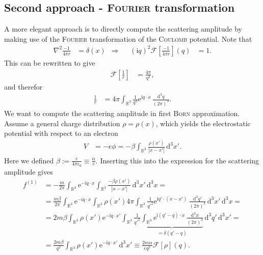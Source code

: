\documentclass[english, parskip=full]{scrartcl}
\newcommand{\intr}{}
\newcommand{\klam}{}
\def\I{\text{i}}
\def\e{\text{e}}
\begin{document}
\subsection{Second approach - \textsc{Fourier} transformation}
A more elegant approach is to directly compute the scattering amplitude by making use of the \textsc{Fourier} transformation of the \textsc{Coulomb} potential.
Note that
\begin{align}
\nabla^2\frac{-1}{4\pi r}&=\delta (x)&\Rightarrow && (\I q)^2\mathcal{F}\klam\left[ {\frac{-1}{4\pi r}} \right](q)&=1.
\end{align}
This can be rewritten to give
\begin{align}
\mathcal{F}\klam\left[ {\frac{1}{r}} \right]&=\frac{4\pi}{q^2},
\end{align}
and therefor
\begin{align}
\frac{1}{r}&=4\pi\intr\int_{\mathbb{R}^{3}}\frac{1}{q^2}\e^{\I q\cdot x}\,\frac{\mathrm{d}^{3}q}{(2\pi)^3}.
\end{align}
We want to compute the scattering amplitude in first \textsc{Born} approximation.
Assume a general charge distribution $\rho=\rho(x)$, which yields the electrostatic potential with respect to an electron
\begin{align}
V&=-e\phi=-\beta\intr\int_{\mathbb{R}^{3}}{\frac{\rho(x')}{|x-x'|}}\,\mathrm{d}^{3}x'.
\end{align}
Here we defined $\beta:=\frac{e}{4\pi\epsilon_0}\equiv\frac{\alpha}{e}$.
Inserting this into the expression for the scattering amplitude gives
\begin{align}
f^{(1)}&=-\frac{m}{2\pi}\intr\int_{\mathbb{R}^{3}}\e^{-\I q\cdot x}\intr\int_{\mathbb{R}^{3}}\frac{-\beta\rho (x')}{|x-x'|}\,\mathrm{d}^{3}x'\,\mathrm{d}^{3}x=\\
&=\frac{m\beta}{2\pi}\intr\int_{\mathbb{R}^{3}}\e^{-\I q\cdot x}\intr\int_{\mathbb{R}^{3}}\rho (x')4\pi\intr\int_{\mathbb{R}^{3}}\frac{1}{q'^2}\e^{\I q'\cdot (x-x')}\,\frac{\mathrm{d}^{3}q'}{(2\pi)^3}\,\mathrm{d}^{3}x'\,\mathrm{d}^{3}x=\\
&=2m\beta\intr\int_{\mathbb{R}^{3}}\rho(x')\e^{-\I q\cdot x'}\intr\int_{\mathbb{R}^{3}}\frac{1}{q'^2}\underbrace{\intr\int_{\mathbb{R}^{3}}\e^{\I (q'-q)\cdot x}\,\frac{\mathrm{d}^{3}x}{(2\pi)^3}}_{=\delta (q'-q)}\,\mathrm{d}^{3}q'\,\mathrm{d}^{3}x'=\\
&=\frac{2m\beta}{q^2}\intr\int_{\mathbb{R}^{3}}{\rho(x')\e^{-\I q\cdot x'}}\,\mathrm{d}^{3}x'\equiv\frac{2m\alpha}{eq^2}\mathcal{F}[\rho](q).
\end{align}
\end{document}
